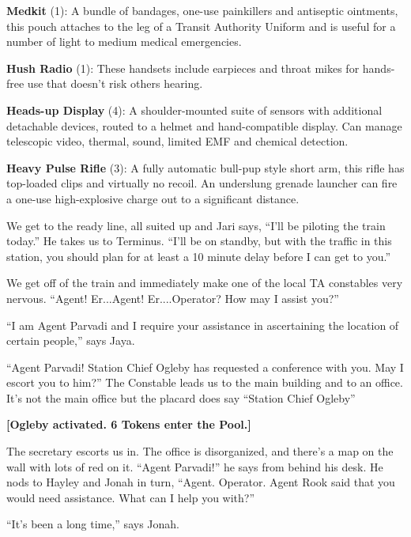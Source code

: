 \textbf{Medkit} (1): A bundle of bandages, one-use painkillers and antiseptic ointments, this pouch attaches to the leg of a Transit Authority Uniform and is useful for a number of light to medium medical emergencies.

\textbf{Hush Radio} (1): These handsets include earpieces and throat mikes for hands-free use that doesn't risk others hearing.

\textbf{Heads-up Display} (4): A shoulder-mounted suite of sensors with additional detachable devices, routed to a helmet and hand-compatible display. Can manage telescopic video, thermal, sound, limited EMF and chemical detection.

\textbf{Heavy Pulse Rifle }(3): A fully automatic bull-pup style short arm, this rifle has top-loaded clips and virtually no recoil. An underslung grenade launcher can fire a one-use high-explosive charge out to a significant distance.





We get to the ready line, all suited up and Jari says, ``I'll be piloting the train today.''  He takes us to Terminus.  ``I'll be on standby, but with the traffic in this station, you should plan for at least a 10 minute delay before I can get to you.''



We get off of the train and immediately make one of the local TA constables very nervous.  ``Agent!  Er...Agent!  Er....Operator?  How may I assist you?''

``I am Agent Parvadi and I require your assistance in ascertaining the location of certain people,'' says Jaya.

``Agent Parvadi!  Station Chief Ogleby has requested a conference with you.  May I escort you to him?''  The Constable leads us to the main building and to an office. It's not the main office but the placard does say ``Station Chief Ogleby''



\textbf{{[}Ogleby activated.  6 Tokens enter the Pool.{]}}



The secretary escorts us in.  The office is disorganized, and there's a map on the wall with lots of red on it.  ``Agent Parvadi!'' he says from behind his desk.  He nods to Hayley and Jonah in turn, ``Agent.  Operator.  Agent Rook said that you would need assistance.  What can I help you with?''

``It's been a long time,'' says Jonah.

